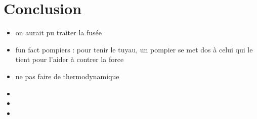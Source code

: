 \section*{Conclusion}


\begin{remarques} \begin{itemize} 
\item on aurait pu traiter la fusée
\item fun fact pompiers : pour tenir le tuyau, un pompier se met dos à celui qui le tient pour l'aider à contrer la force 
\item ne pas faire de thermodynamique
\item 
\item 
\item 
\end{itemize} \end{remarques}